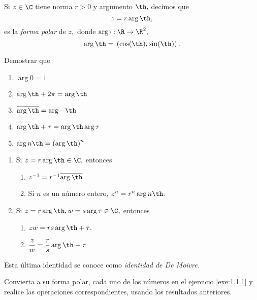 \begin{definicion}
	Si $z\in \C$ tiene norma $r>0$ y argumento $\th,$ decimos que $$
	z=r\arg{\th},
	$$
	es la \emph{forma polar} de $z,$ donde $\arg{\cdot}:\R\to\R^{2},$
	$$
	\arg{\th}=\, \left( \cos(\th), \sin (\th) \right).
	$$
\end{definicion}

\begin{problema}
	Demostrar que
	\begin{enumerate}
		\item $\arg{0}=1$
		\item $\arg{\th+2\pi}=\arg{\th}$
		\item $\overline{\arg{\th}}=\arg{-\th}$
		\item $\arg{\th+\tau}=\arg{\th}\arg{\tau}$
		\item $\arg{n\th}=\left( \arg{\th} \right)^{n}$
	\end{enumerate}
	
\end{problema}

\begin{problema}
	\begin{enumerate}
		\item Si $z=r\arg{\th} \in \C,$ entonces
		\begin{enumerate}
			\item   $
			z^{-1}=r^{-1} \overline{\arg{\th}}
			$
			\item Si $n$ es un número entero, $
			z^{n}=r^{n}\arg{n \th}.
			$
		\end{enumerate}
		
		
		\item Si $z=r\arg{\th}, w=s\arg{\tau} \in \C,$ entonces
		\begin{enumerate}
			\item   $
			zw=rs\arg{\th+\tau}.
			$
			\item
			$
			\dfrac{z}{w}=\dfrac{r}{s}\arg{\th-\tau}
			$
		\end{enumerate}
		
		
		
		
		
	\end{enumerate}
	
\end{problema}

Esta última identidad se conoce como \emph{identidad de De Moivre.}


\begin{problema}
	Convierta a su forma polar, cada uno de los números en el ejercicio \ref{exe:1.1.1} y realice las operaciones
	correspondientes, usando los resultados anteriores. 
\end{problema}


